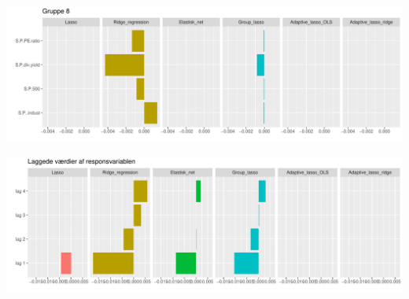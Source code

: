 \begin{landscape}
\includegraphics[scale=0.75]{fig/img/coef_group8.pdf}
\end{landscape}

\begin{landscape}
\includegraphics[scale=0.75]{fig/img/coef_group9.pdf}
\end{landscape}

